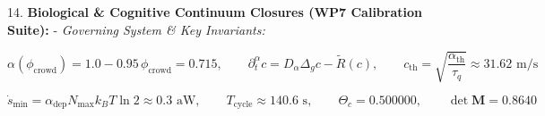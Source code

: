 \documentclass[11pt,a4paper]{article}
\theoremstyle{definition}
\theoremstyle{remark}
\begin{document}
14. \textbf{Biological \& Cognitive Continuum Closures (WP7 Calibration Suite):}
- \textit{Governing System \& Key Invariants:}


\begin{equation}
\alpha(\phi_{\text{crowd}}) = 1.0 - 0.95\,\phi_{\text{crowd}} = 0.715, \qquad \partial_t^\alpha c = D_\alpha \Delta_g c - \tilde{R}(c), \qquad c_{\text{th}} = \sqrt{\frac{\alpha_{\text{th}}}{\tau_q}} \approx 31.62\text{ m/s}
\end{equation}



\begin{equation}
\dot{s}_{\min} = \alpha_{\text{dep}} N_{\max} k_B T \ln 2 \approx 0.3\text{ aW}, \qquad T_{\text{cycle}} \approx 140.6\text{ s}, \qquad \Theta_c = 0.500000, \qquad \det \mathbf{M} = 0.8640
\end{equation}
\end{document}

